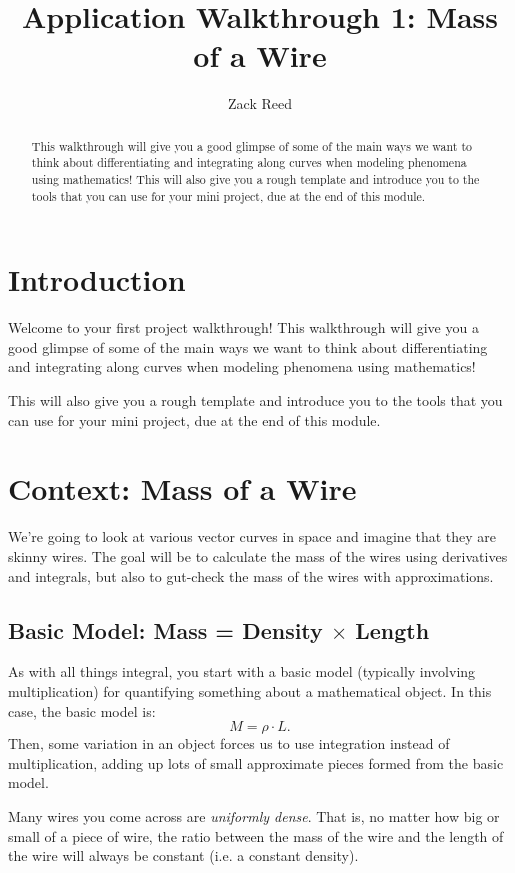 \documentclass{ximera}
\title{Application Walkthrough 1: Mass of a Wire}
\author{Zack Reed}
\begin{document}
\begin{abstract}
This walkthrough will give you a good glimpse of some of the main ways we want to think about differentiating and integrating along curves when modeling phenomena using mathematics! This will also give you a rough template and introduce you to the tools that you can use for your mini project, due at the end of this module.
\end{abstract}
\maketitle

\section*{Introduction}

Welcome to your first project walkthrough!
This walkthrough will give you a good glimpse of some of the main ways we want to think about differentiating and integrating along curves when modeling phenomena using mathematics! 

This will also give you a rough template and introduce you to the tools that you can use for your mini project, due at the end of this module.

\section*{Context: Mass of a Wire}

We're going to look at various vector curves in space and imagine that they are skinny wires. The goal will be to calculate the mass of the wires using derivatives and integrals, but also to gut-check the mass of the wires with approximations.

\subsection*{Basic Model: Mass = Density $\times$ Length}

As with all things integral, you start with a basic model (typically involving multiplication) for quantifying something about a mathematical object. In this case, the basic model is:
\[
M = \rho \cdot L.
\]
Then, some variation in an object forces us to use integration instead of multiplication, adding up lots of small approximate pieces formed from the basic model.

Many wires you come across are \emph{uniformly dense}. That is, no matter how big or small of a piece of wire, the ratio between the mass of the wire and the length of the wire will always be constant (i.e. a constant density).
\end{document}
